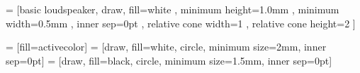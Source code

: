 
 = [basic loudspeaker, draw, fill=white
, minimum height=1.0mm 	    %
, minimum width=0.5mm		    %
, inner sep=0pt
, relative cone width=1	%
, relative cone height=2	    %
]

 = [fill=activecolor]
 = [draw, fill=white, circle, minimum size=2mm, inner sep=0pt]
 = [draw, fill=black, circle, minimum size=1.5mm, inner 
sep=0pt]


